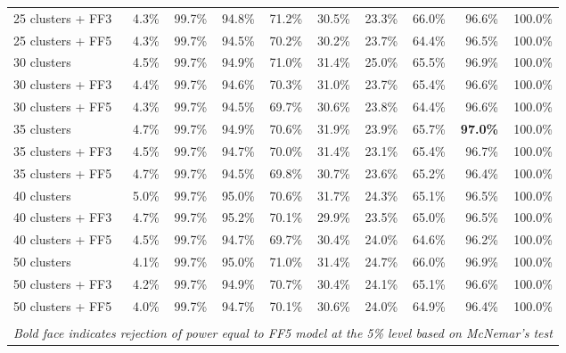 \begin{table}[!h]
\begin{center}
\begin{tabular}{lrrrrrrrrr}
25 clusters + FF3	& 4.3\% & 99.7\% & 94.8\% & 71.2\% & 30.5\% & 23.3\% & 66.0\% & 96.6\% & 100.0\% \\
25 clusters + FF5	& 4.3\% & 99.7\% & 94.5\% & 70.2\% & 30.2\% & 23.7\% & 64.4\% & 96.5\% & 100.0\% \\
30 clusters	& 4.5\% & 99.7\% & 94.9\% & 71.0\% & 31.4\% & 25.0\% & 65.5\% & 96.9\% & 100.0\% \\
30 clusters + FF3	& 4.4\% & 99.7\% & 94.6\% & 70.3\% & 31.0\% & 23.7\% & 65.4\% & 96.6\% & 100.0\% \\
30 clusters + FF5	& 4.3\% & 99.7\% & 94.5\% & 69.7\% & 30.6\% & 23.8\% & 64.4\% & 96.6\% & 100.0\% \\
35 clusters	& 4.7\% & 99.7\% & 94.9\% & 70.6\% & 31.9\% & 23.9\% & 65.7\% & \textbf{97.0\%} & 100.0\% \\
35 clusters + FF3	& 4.5\% & 99.7\% & 94.7\% & 70.0\% & 31.4\% & 23.1\% & 65.4\% & 96.7\% & 100.0\% \\
35 clusters + FF5	& 4.7\% & 99.7\% & 94.5\% & 69.8\% & 30.7\% & 23.6\% & 65.2\% & 96.4\% & 100.0\% \\
40 clusters	& 5.0\% & 99.7\% & 95.0\% & 70.6\% & 31.7\% & 24.3\% & 65.1\% & 96.5\% & 100.0\% \\
40 clusters + FF3	& 4.7\% & 99.7\% & 95.2\% & 70.1\% & 29.9\% & 23.5\% & 65.0\% & 96.5\% & 100.0\% \\
40 clusters + FF5	& 4.5\% & 99.7\% & 94.7\% & 69.7\% & 30.4\% & 24.0\% & 64.6\% & 96.2\% & 100.0\% \\
50 clusters	& 4.1\% & 99.7\% & 95.0\% & 71.0\% & 31.4\% & 24.7\% & 66.0\% & 96.9\% & 100.0\% \\
50 clusters + FF3	& 4.2\% & 99.7\% & 94.9\% & 70.7\% & 30.4\% & 24.1\% & 65.1\% & 96.6\% & 100.0\% \\
50 clusters + FF5	& 4.0\% & 99.7\% & 94.7\% & 70.1\% & 30.6\% & 24.0\% & 64.9\% & 96.4\% & 100.0\% \\
\hline\\
\multicolumn{10}{l}{\itshape Bold face indicates rejection of power equal to FF5 model at the 5\% level based on McNemar's test}
    \end{tabular}
    \end{center}
\end{table}
